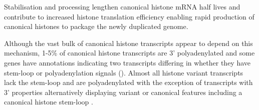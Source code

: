 	Stabilisation and processing lengthen canonical histone mRNA half lives 
	and contribute to increased histone translation efficiency 
	enabling rapid production of canonical histones to package the newly duplicated genome.

	Although the vast bulk of canonical histone transcripts appear to depend on this mechanism, 
	1-5\% of canonical histone transcripts are 3' polyadenylated  
	and some genes have annotations indicating two transcripts 
	differing in whether they have stem-loop or polyadenylation signals (). 
	Almost all histone variant transcripts lack the stem-loop and are polyadenylated 
	with the exception of transcripts with 3' properties alternatively displaying
	variant or canonical features including a canonical histone stem-loop \citep{HTwoAX-transcripts}. 


